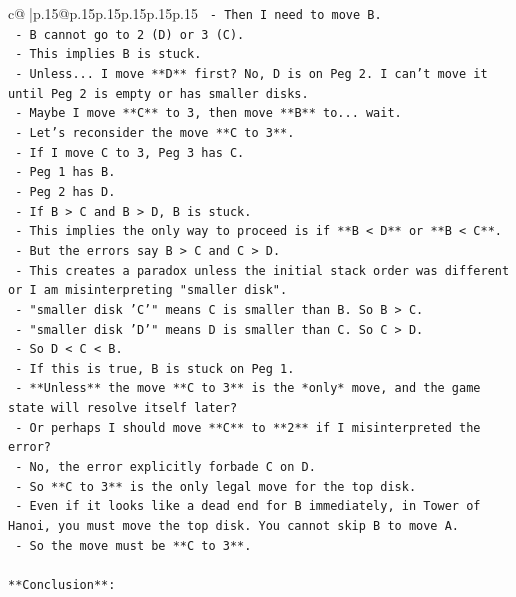 \documentclass{article}
\begin{document}
{\begin{supertabular}{c@{$\;$}|p{.15\linewidth}@{}p{.15\linewidth}p{.15\linewidth}p{.15\linewidth}p{.15\linewidth}p{.15\linewidth}}
{{{\texttt{    {-} Then I need to move B.} \\
\texttt{    {-} B cannot go to 2 (D) or 3 (C).} \\
\texttt{    {-} This implies B is stuck.} \\
\texttt{    {-} Unless... I move **D** first? No, D is on Peg 2. I can't move it until Peg 2 is empty or has smaller disks.} \\
\texttt{    {-} Maybe I move **C** to 3, then move **B** to... wait.} \\
\texttt{    {-} Let's reconsider the move **C to 3**.} \\
\texttt{    {-} If I move C to 3, Peg 3 has C.} \\
\texttt{    {-} Peg 1 has B.} \\
\texttt{    {-} Peg 2 has D.} \\
\texttt{    {-} If B > C and B > D, B is stuck.} \\
\texttt{    {-} This implies the only way to proceed is if **B < D** or **B < C**.} \\
\texttt{    {-} But the errors say B > C and C > D.} \\
\texttt{    {-} This creates a paradox unless the initial stack order was different or I am misinterpreting "smaller disk".} \\
\texttt{    {-} "smaller disk 'C'" means C is smaller than B. So B > C.} \\
\texttt{    {-} "smaller disk 'D'" means D is smaller than C. So C > D.} \\
\texttt{    {-} So D < C < B.} \\
\texttt{    {-} If this is true, B is stuck on Peg 1.} \\
\texttt{    {-} **Unless** the move **C to 3** is the *only* move, and the game state will resolve itself later?} \\
\texttt{    {-} Or perhaps I should move **C** to **2** if I misinterpreted the error?} \\
\texttt{    {-} No, the error explicitly forbade C on D.} \\
\texttt{    {-} So **C to 3** is the only legal move for the top disk.} \\
\texttt{    {-} Even if it looks like a dead end for B immediately, in Tower of Hanoi, you must move the top disk. You cannot skip B to move A.} \\
\texttt{    {-} So the move must be **C to 3**.} \\
\\ 
\texttt{**Conclusion**:} \\
}}}
\end{supertabular}}
\end{document}
